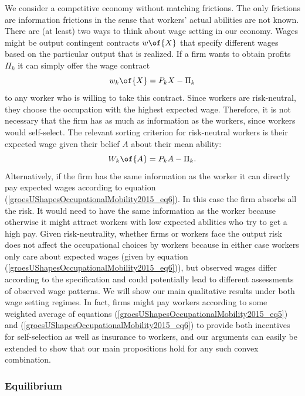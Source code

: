 \documentclass[12pt]{article}
\theoremstyle{definition}
\begin{document}
We consider a competitive economy without matching frictions. The only frictions are information frictions in the sense that workers' actual abilities are not known. There are (at least) two ways to think about wage setting in our economy. Wages might be output contingent contracts $w\of{X}$ that specify different wages based on the particular output that is realized. If a firm wants to obtain profits $\Pi_k$ it can simply offer the wage contract 
\begin{equation}
    \label{groesUShapesOccupationalMobility2015_eq5}
    w_k\of{X} = P_k X - \Pi_k 
\end{equation}
to any worker who is willing to take this contract. Since workers are risk-neutral, they choose the occupation with the highest expected wage. Therefore, it is not necessary that the firm has as much as information as the workers, since workers would self-select. The relevant sorting criterion for risk-neutral workers is their expected wage given their belief $A$ about their mean ability:
\begin{equation}
    \label{groesUShapesOccupationalMobility2015_eq6}
    W_{k}\of{A} = P_k A - \Pi_k.
\end{equation}
Alternatively, if the firm has the same information as the worker it can directly pay expected wages according to equation (\ref{groesUShapesOccupationalMobility2015_eq6}). In this case the firm absorbs all the risk. It would need to have the same information as the worker because otherwise it might attract workers with low expected abilities who try to get a high pay. Given risk-neutrality, whether firms or workers face the output risk does not affect the occupational choices by workers because in either case workers only care about expected wages (given by equation (\ref{groesUShapesOccupationalMobility2015_eq6})), but observed wages differ according to the specification and could potentially lead to different assessments of observed wage patterns. We will show our main qualitative results under both wage setting regimes. In fact, firms might pay workers according to some weighted average of equations (\ref{groesUShapesOccupationalMobility2015_eq5}) and (\ref{groesUShapesOccupationalMobility2015_eq6}) to provide both incentives for self-selection as well as insurance to workers, and our arguments can easily be extended to show that our main propositions hold for any such convex combination.

\subsubsection{Equilibrium}
\end{document}
